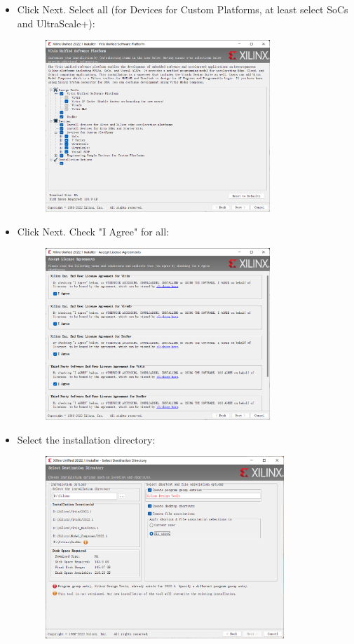 \documentclass[a4paper,12pt,twoside]{article}
\begin{document}
\begin{itemize}
\begin{figure}[H]
    \end{figure}
    \item Click Next. Select all (for Devices for Custom Platforms, at least select SoCs and UltraScale+):
    \begin{figure}[H]
        \centering
        \includegraphics[width=0.8\textwidth]{3.png}
    \end{figure}
    \item Click Next. Check "I Agree" for all:
    \begin{figure}[H]
        \centering
        \includegraphics[width=0.8\textwidth]{4.png}
    \end{figure}
    \item Select the installation directory:
    \begin{figure}[H]
        \centering
        \includegraphics[width=0.85\textwidth]{5.png}

\end{figure}
\end{itemize}
\end{document}
